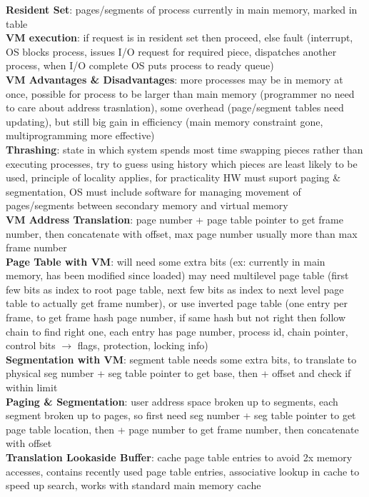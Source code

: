 \documentclass[a4paper]{article}
\begin{document}
\begin{multicols}{2}
        \textbf{Resident Set}: pages/segments of process currently in main memory, marked in table\\
        \textbf{VM execution}: if request is in resident set then proceed, else fault (interrupt, OS blocks process, issues I/O request for required piece, dispatches another process, when I/O complete OS puts process to ready queue)\\
        \textbf{VM Advantages \& Disadvantages}: more processes may be in memory at once, possible for process to be larger than main memory (programmer no need to care about address trasnlation), some overhead (page/segment tables need updating), but still big gain in efficiency (main memory constraint gone, multiprogramming more effective)\\
        \textbf{Thrashing}: state in which system spends most time swapping pieces rather than executing processes, try to guess using history which pieces are least likely to be used, principle of locality applies, for practicality HW must suport paging \& segmentation, OS must include software for managing movement of pages/segments between secondary memory and virtual memory\\
        \textbf{VM Address Translation}: page number + page table pointer to get frame number, then concatenate with offset, max page number usually more than max frame number\\
        \textbf{Page Table with VM}: will need some extra bits (ex: currently in main memory, has been modified since loaded) may need multilevel page table (first few bits as index to root page table, next few bits as index to next level page table to actually get frame number), or use inverted page table (one entry per frame, to get frame hash page number, if same hash but not right then follow chain to find right one, each entry has page number, process id, chain pointer, control bits $\to$ flags, protection, locking info)\\
        \textbf{Segmentation with VM}: segment table needs some extra bits, to translate to physical seg number + seg table pointer to get base, then + offset and check if within limit\\
        \textbf{Paging \& Segmentation}: user address space broken up to segments, each segment broken up to pages, so first need seg number + seg table pointer to get page table location, then + page number to get frame number, then concatenate with offset\\
        \textbf{Translation Lookaside Buffer}: cache page table entries to avoid 2x memory accesses, contains recently used page table entries, associative lookup in cache to speed up search, works with standard main memory cache\\
    \end{multicols}
    
\end{document}

